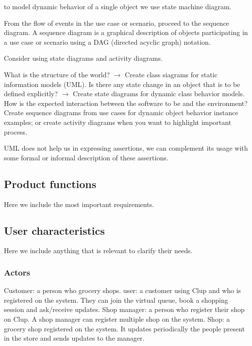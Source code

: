 to model dynamic behavior of a single object we use state machine diagram.

From the flow of events in the use case or scenario, proceed to the sequence diagram. A sequence diagram is a graphical description of objects participating in a use case or scenario using a DAG (directed acyclic graph) notation.

Consider using state diagrams and activity diagrams.

What is the structure of the world? $\rightarrow$ Create class siagrams for static information models (UML). Is there any state change in an object that is to be defined explicitly? $\rightarrow$ Create state diagrams for dynamic class behavior models. How is the expected interaction between the software to be and the environment? Create sequence diagrams from use cases for dynamic object behavior instance examples; or create activity diagrams when you want to highlight important process.

UML does not help us in expressing assertions, we can complement its usage with some formal or informal description of these assertions.

\subsection{Product functions}
\label{subsect:productfunctions}

Here we include the most important requirements.

\subsection{User characteristics}
\label{subsect:usercharacteristics}

Here we include anything that is relevant to clarify their needs.

\subsubsection{Actors}
\label{subsubsect:actors}

Customer: a person who grocery shops.
user: a customer using Clup and who is registered on the system. They can join the virtual queue, book a shopping session and ask/receive updates.
Shop manager: a person who register their shop on Clup. A shop manager can register multiple shop on the system.
Shop: a grocery shop registered on the system. It updates periodically the people present in the store and sends updates to the manager.

